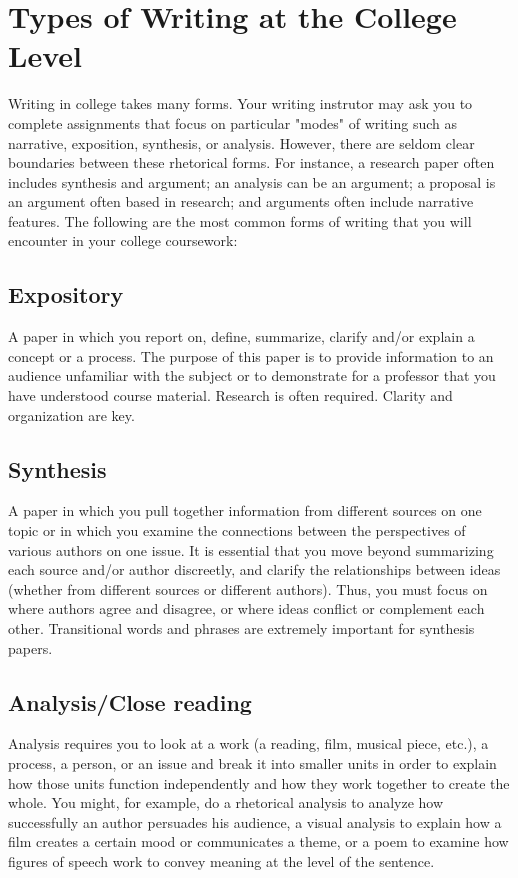 
\chapter{Types of Writing at the College Level}

Writing in college takes many forms. Your writing instrutor may ask you to complete 
assignments that focus on particular "modes" of writing such as narrative, exposition, 
synthesis, or analysis. However, there are seldom clear boundaries between these 
rhetorical forms. For instance, a research paper often includes synthesis and argument; 
an analysis can be an argument; a proposal is an argument often based in research; and 
arguments often include narrative features. The following are the most common forms 
of writing that you will encounter in your college coursework:


\section{Expository}
A paper in which you report on, define, summarize, clarify and/or explain a concept or 
a process. The purpose of this paper is to provide information to an audience unfamiliar 
with the subject or to demonstrate for a professor that you have understood course 
material.  Research is often required. Clarity and organization are key.

\section{Synthesis}

A paper in which you pull together information from different sources on one topic or 
in which you examine the connections between the perspectives of various authors on 
one issue. It is essential that you move beyond summarizing each source and/or author 
discreetly, and clarify the relationships between ideas (whether from different sources 
or different authors). Thus, you must focus on where authors agree and disagree, or 
where ideas conflict or complement each other. Transitional words and phrases are 
extremely important for synthesis papers.

\section{Analysis/Close reading}
Analysis requires you to look at a work (a reading, film, musical piece, etc.), a process, 
a person, or an issue and break it into smaller units in order to explain how those units 
function independently and how they work together to create the whole. You might, 
for example, do a rhetorical analysis to analyze how successfully an author persuades his 
audience, a visual analysis to explain how a film creates a certain mood or communicates 
a theme, or a poem to examine how figures of speech work to convey meaning at the 
level of the sentence.

